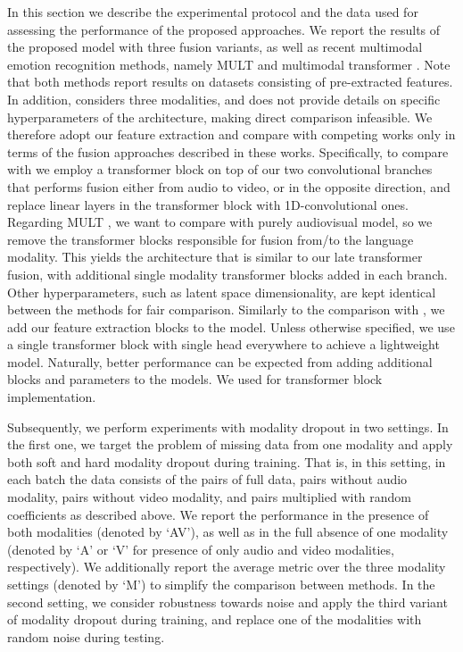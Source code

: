 \documentclass[a4paper,conference]{IEEEtran}
\begin{document}
In this section we describe the experimental protocol and the data used for assessing the performance of the proposed approaches. We report the results of the proposed model with three fusion variants, as well as recent multimodal emotion recognition methods, namely MULT \cite{mult} and multimodal transformer \cite{icasspav}. Note that both methods report results on datasets consisting of pre-extracted features. In addition, \cite{mult} considers three modalities, and \cite{icasspav} does not provide details on specific hyperparameters of the architecture, making direct comparison infeasible. We therefore adopt our feature extraction and compare with competing works only in terms of the fusion approaches described in these works. Specifically, to compare with \cite{icasspav} we employ a transformer block on top of our two convolutional branches that performs fusion either from audio to video, or in the opposite direction, and replace linear layers in the transformer block with 1D-convolutional ones. Regarding MULT \cite{mult}, we want to compare with purely audiovisual model, so we remove the transformer blocks responsible for fusion from/to the language modality. This yields the architecture that is similar to our late transformer fusion, with additional single modality transformer blocks added in each branch. Other hyperparameters, such as latent space dimensionality, are kept identical between the methods for fair comparison. Similarly to the comparison with \cite{mult}, we add our feature extraction blocks to the model. Unless otherwise specified, we use a single transformer block with single head everywhere to achieve a lightweight model. Naturally, better performance can be expected from adding additional blocks and parameters to the models. We used \cite{timm} for transformer block implementation.

Subsequently, we perform experiments with modality dropout in two settings. In the first one, we target the problem of missing data from one modality and apply both soft and hard modality dropout during training. That is, in this setting, in each batch the data consists of the pairs of full data, pairs without audio modality, pairs without video modality, and pairs multiplied with random coefficients as described above. We report the performance in the presence of both modalities (denoted by `AV'), as well as in the full absence of one modality (denoted by `A' or `V' for presence of only audio and video modalities, respectively). We additionally report the average metric over the three modality settings (denoted by `M') to simplify the comparison between methods. In the second setting, we consider robustness towards noise and apply the third variant of modality dropout during training, and replace one of the modalities with random noise during testing. 
\end{document}
